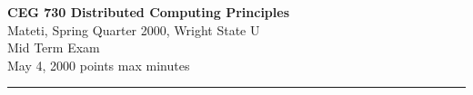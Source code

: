 \def\fat{\framebox[1mm]{\rule{0mm}{2mm}}}
\def\ellipsis{\ldots}
\def\pbar{\parallel}
\def\rar{\rightarrow}
\def\CSP{{\sc csp}}
\def\RPC{{\sc rpc}}
\def\co{{\bf co}}
\def\oc{{\bf oc}}
\def\pa{{$\parallel$}}
\def\lb{$\langle$}
\def\rb{$\rangle$}
\def\ra{$\rightarrow$}
\def\await{{\bf await}}
\def\zand{\wedge}\def\zor{\vee}	\def\znot{\neg}
\parindent=0pt



{\bf CEG 
\large \bf 730 Distributed Computing Principles}\\[5pt]
{Mateti,  Spring Quarter 2000, Wright State U}\\
Mid Term Exam\\
May 4, 2000  points max  minutes\\
\hrule

